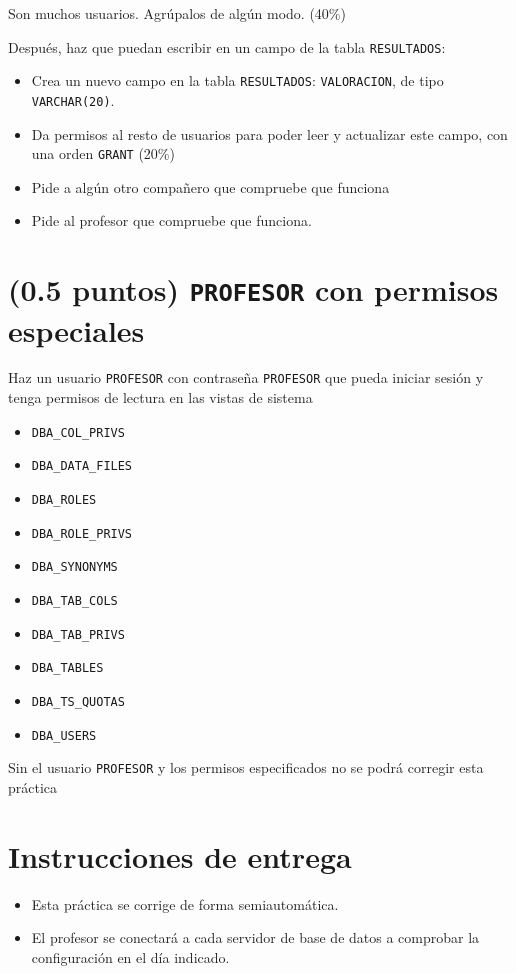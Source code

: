 \documentclass[a4paper]{article}
\begin{document}
\begin{Aviso}
Son muchos usuarios. Agrúpalos de algún modo. (40\%)
\end{Aviso}

Después, haz que puedan escribir en un campo de la tabla \texttt{RESULTADOS}:
\begin{itemize}
\item Crea un nuevo campo en la tabla \texttt{RESULTADOS}: \texttt{VALORACION}, de tipo \texttt{VARCHAR(20)}.
\item Da permisos al resto de usuarios para poder leer y actualizar este campo, con una orden \texttt{GRANT} (20\%)
\item Pide a algún otro compañero que compruebe que funciona
\item Pide al profesor que compruebe que funciona.
\end{itemize}


\section{(0.5 puntos) \texttt{PROFESOR} con permisos especiales}
\label{sec:org000000f}
Haz un usuario \texttt{PROFESOR} con contraseña \texttt{PROFESOR} que pueda iniciar sesión y tenga permisos de lectura en las vistas de sistema
\begin{itemize}
\item \texttt{DBA\_COL\_PRIVS}
\item \texttt{DBA\_DATA\_FILES}
\item \texttt{DBA\_ROLES}
\item \texttt{DBA\_ROLE\_PRIVS}
\item \texttt{DBA\_SYNONYMS}
\item \texttt{DBA\_TAB\_COLS}
\item \texttt{DBA\_TAB\_PRIVS}
\item \texttt{DBA\_TABLES}
\item \texttt{DBA\_TS\_QUOTAS}
\item \texttt{DBA\_USERS}
\end{itemize}


\begin{Aviso}
Sin el usuario \texttt{PROFESOR} y los permisos especificados no se podrá corregir esta práctica
\end{Aviso}
\section*{Instrucciones de entrega}
\label{sec:org0000012}
\begin{itemize}
\item Esta práctica se corrige de forma semiautomática.
\item El profesor se conectará a cada servidor de base de datos a comprobar la configuración en el día indicado.
\end{itemize}
\end{document}
